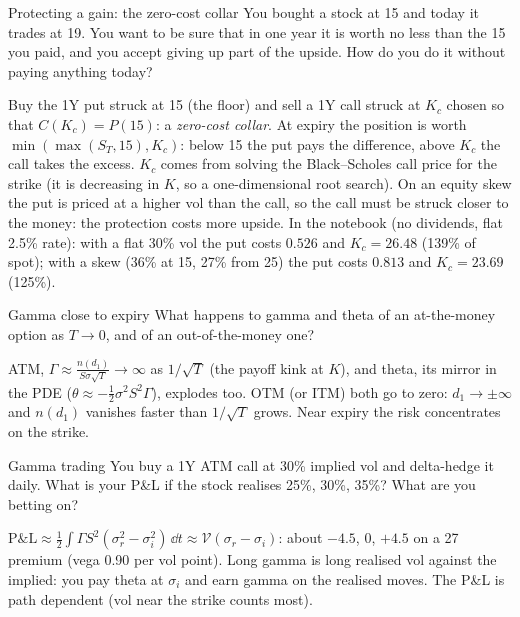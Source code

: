 \begin{question}{\Theory \Practice {}}{Protecting a gain: the zero-cost collar}
You bought a stock at 15 and today it trades at 19. You want to be sure that in one year it is worth no less than
the 15 you paid, and you accept giving up part of the upside. How do you do it without paying anything today?
\end{question}
\begin{answer}
Buy the 1Y put struck at 15 (the floor) and sell a 1Y call struck at $K_c$ chosen so that $C(K_c) = P(15)$: a
\emph{zero-cost collar}. At expiry the position is worth $\min(\max(S_T, 15), K_c)$: below 15 the put pays the
difference, above $K_c$ the call takes the excess. $K_c$ comes from solving the Black--Scholes call price for the
strike (it is decreasing in $K$, so a one-dimensional root search). On an equity skew the put is priced at a higher
vol than the call, so the call must be struck closer to the money: the protection costs more upside. In the notebook
(no dividends, flat 2.5\% rate): with a flat 30\% vol the put costs $0.526$ and $K_c = 26.48$ (139\% of spot); with a
skew (36\% at 15, 27\% from 25) the put costs $0.813$ and $K_c = 23.69$ (125\%).
\end{answer}

\begin{question}{\Theory {}}{Gamma close to expiry}
What happens to gamma and theta of an at-the-money option as $T \to 0$, and of an out-of-the-money one?
\end{question}
\begin{answer}
ATM, $\Gamma \approx \frac{n(d_1)}{S\sigma\sqrt T} \to \infty$ as $1/\sqrt T$ (the payoff kink at $K$), and theta, its mirror in the
PDE ($\theta \approx -\tfrac12 \sigma^2 S^2 \Gamma$), explodes too. OTM (or ITM) both go to zero: $d_1 \to \pm\infty$ and
$n(d_1)$ vanishes faster than $1/\sqrt T$ grows. Near expiry the risk concentrates on the strike.
\end{answer}

\begin{question}{\Theory {}}{Gamma trading}
You buy a 1Y ATM call at 30\% implied vol and delta-hedge it daily. What is your P\&L if the stock realises 25\%,
30\%, 35\%? What are you betting on? 
\end{question}
\begin{answer}
$\text{P\&L} \approx \tfrac12\int \Gamma S^2(\sigma_r^2 - \sigma_i^2)\,\dd t \approx \mathcal{V}(\sigma_r - \sigma_i)$: about $-4.5$, $0$, $+4.5$
on a 27 premium (vega 0.90 per vol point). Long gamma is long realised vol against the implied: you pay theta at
$\sigma_i$ and earn gamma on the realised moves. The P\&L is path dependent (vol near the strike counts most).
\end{answer}

